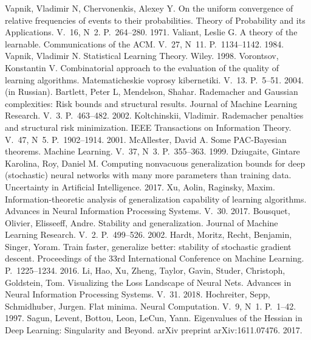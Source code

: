  Vapnik, Vladimir N, Chervonenkis, Alexey Y. On the uniform convergence of relative frequencies of events to their probabilities. Theory of Probability and its Applications. V.~16, N~2. P.~264--280. 1971.
 Valiant, Leslie G. A theory of the learnable. Communications of the ACM. V.~27, N~11. P.~1134--1142. 1984.
 Vapnik, Vladimir N. Statistical Learning Theory. Wiley. 1998.
 Vorontsov, Konstantin V. Combinatorial approach to the evaluation of the quality of learning algorithms. Matematicheskie voprosy kibernetiki. V.~13. P.~5--51. 2004. (in Russian).
 Bartlett, Peter L, Mendelson, Shahar. Rademacher and Gaussian complexities: Risk bounds and structural results. Journal of Machine Learning Research. V.~3. P.~463--482. 2002.
 Koltchinskii, Vladimir. Rademacher penalties and structural risk minimization. IEEE Transactions on Information Theory. V.~47, N~5. P.~1902--1914. 2001.
 McAllester, David A. Some PAC-Bayesian theorems. Machine Learning. V.~37, N~3. P.~355--363. 1999.
 Dziugaite, Gintare Karolina, Roy, Daniel M. Computing nonvacuous generalization bounds for deep (stochastic) neural networks with many more parameters than training data. Uncertainty in Artificial Intelligence. 2017.
 Xu, Aolin, Raginsky, Maxim. Information-theoretic analysis of generalization capability of learning algorithms. Advances in Neural Information Processing Systems. V.~30. 2017.
 Bousquet, Olivier, Elisseeff, Andre. Stability and generalization. Journal of Machine Learning Research. V.~2. P.~499--526. 2002.
 Hardt, Moritz, Recht, Benjamin, Singer, Yoram. Train faster, generalize better: stability of stochastic gradient descent. Proceedings of the 33rd International Conference on Machine Learning. P.~1225--1234. 2016.
 Li, Hao, Xu, Zheng, Taylor, Gavin, Studer, Christoph, Goldstein, Tom. Visualizing the Loss Landscape of Neural Nets. Advances in Neural Information Processing Systems. V.~31. 2018.
 Hochreiter, Sepp, Schmidhuber, Jurgen. Flat minima. Neural Computation. V.~9, N~1. P.~1--42. 1997.
 Sagun, Levent, Bottou, Leon, LeCun, Yann. Eigenvalues of the Hessian in Deep Learning: Singularity and Beyond. arXiv preprint arXiv:1611.07476. 2017.
